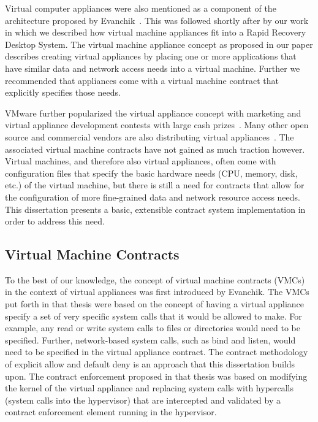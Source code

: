 Virtual computer appliances were also mentioned as a component of the architecture proposed by Evanchik~\cite{evanchik_thesis_2004}. This was followed shortly after by our work in which we described how virtual machine appliances fit into a Rapid Recovery Desktop System\cite{rapid_recovery_paper_05}. The virtual machine appliance concept as proposed in our paper describes creating virtual appliances by placing one or more applications that have similar data and network access needs into a virtual machine. Further we recommended that appliances come with a virtual machine contract that explicitly specifies those needs.

VMware further popularized the virtual appliance concept with marketing and virtual appliance development contests with large cash prizes~\cite{herrod_keynote_2006,vmware_appliances_website}. Many other open source and commercial vendors are also distributing virtual appliances~\cite{rPath_website, stacklet_website, virtual_appliances_website, jumpbox_website}. The associated virtual machine contracts have not gained as much traction however. Virtual machines, and therefore also virtual appliances, often come with configuration files that specify the basic hardware needs (CPU, memory, disk, etc.) of the virtual machine, but there is still a need for contracts that allow for the configuration of more fine-grained data and network resource access needs. This dissertation presents a basic, extensible contract system implementation in order to address this need.

\subsection{Virtual Machine Contracts}
\label{VirtualMachineContracts}
To the best of our knowledge, the concept of virtual machine contracts (VMCs) in the context of virtual appliances was first introduced by Evanchik\cite{evanchik_thesis_2004}. The VMCs put forth in that thesis were based on the concept of having a virtual appliance specify a set of very specific system calls that it would be allowed to make. For example, any read or write system calls to files or directories would need to be specified. Further, network-based system calls, such as bind and listen, would need to be specified in the virtual appliance contract. The contract methodology of explicit allow and default deny is an approach that this dissertation builds upon. The contract enforcement proposed in that thesis was based on modifying the kernel of the virtual appliance and replacing system calls with hypercalls (system calls into the hypervisor) that are intercepted and validated by a contract enforcement element running in the hypervisor. 

